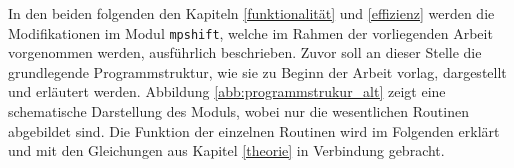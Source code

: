 In den beiden folgenden den Kapiteln \ref{funktionalität} und \ref{effizienz} werden die Modifikationen im Modul \texttt{mpshift}, welche im Rahmen der vorliegenden Arbeit vorgenommen werden, ausführlich beschrieben. Zuvor soll an dieser Stelle die grundlegende Programmstruktur, wie sie zu Beginn der Arbeit vorlag, dargestellt und erläutert werden. Abbildung \ref{abb:programmstrukur_alt} zeigt eine schematische Darstellung des Moduls, wobei nur die wesentlichen Routinen abgebildet sind. Die Funktion der einzelnen Routinen wird im Folgenden erklärt und mit den Gleichungen aus Kapitel \ref{theorie} in Verbindung gebracht.


